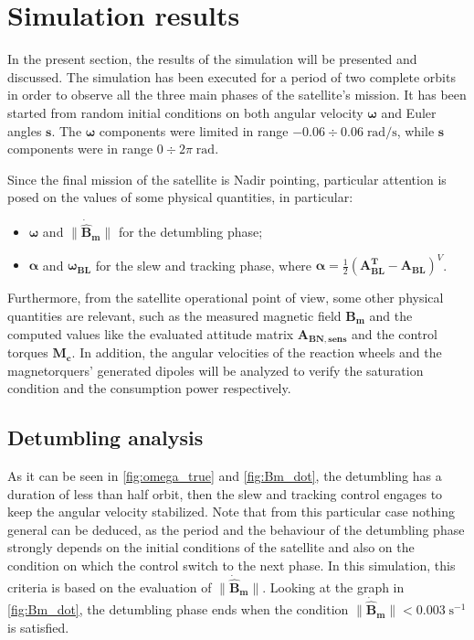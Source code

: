 \section{Simulation results}
\label{sec:sim_results}

In the present section, the results of the simulation will be presented and discussed. The simulation has been executed for a period of two complete orbits in order to observe all the three main phases of the satellite's mission. It has been started from random initial conditions on both angular velocity $\boldsymbol{\omega}$ and Euler angles $\boldsymbol{s}$.
The $\boldsymbol{\omega}$ components were limited in range $-0.06 \div 0.06 \; \text{rad/s}$, while $\boldsymbol{s}$ components were in range $0 \div 2 \pi \; \text{rad}$.

Since the final mission of the satellite is Nadir pointing, particular attention is posed on the values of some physical quantities, in particular:

\begin{itemize}[wide,itemsep=3pt,topsep=3pt]
    \item $\boldsymbol{\omega}$ and $\lVert \boldsymbol{\dot{\hat{{B}}}_m} \rVert$ for the detumbling phase;
    \item $\boldsymbol{\alpha}$ and $\boldsymbol{\omega_{BL}}$ for the slew and tracking phase, where $\boldsymbol{\alpha} = \frac{1}{2} \left(   \boldsymbol{A_{BL}^T - A_{BL}} \right)^V$.
\end{itemize}

Furthermore, from the satellite operational point of view, some other physical quantities are relevant, such as the measured magnetic field $\boldsymbol{B_m}$ and the computed values like the evaluated attitude matrix $\boldsymbol{A_{BN,sens}}$ and the control torques $\boldsymbol{M_c}$. In addition, the angular velocities of the reaction wheels and the magnetorquers' generated dipoles will be analyzed to verify the saturation condition and the consumption power respectively.


\subsection{Detumbling analysis}
\label{subsec:detumb_analysis}


As it can be seen in \autoref{fig:omega_true} and \autoref{fig:Bm_dot}, the detumbling has a duration of less than half orbit, then the slew and tracking control engages to keep the angular velocity stabilized. Note that from this particular case nothing general can be deduced, as the period and the behaviour of the detumbling phase strongly depends on the initial conditions of the satellite and also on the condition on which the control switch to the next phase. In this simulation, this criteria is based on the evaluation of $\lVert \boldsymbol{\dot{\hat{{B}}}_m} \rVert$.
Looking at the graph in \autoref{fig:Bm_dot}, the detumbling phase ends when the condition $\lVert \boldsymbol{\dot{\hat{{B}}}_m} \rVert < 0.003 \; \text{s}^{-1}$ is satisfied.

